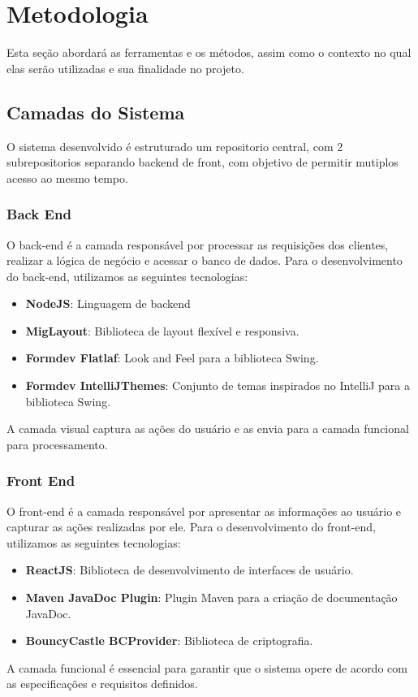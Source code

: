 \documentclass[../main.tex]{subfiles}
\begin{document}
\section{Metodologia}
Esta seção abordará as ferramentas e os métodos, assim como o contexto no qual elas 
serão utilizadas e sua finalidade no projeto.
\subsection{Camadas do Sistema}

O sistema desenvolvido é estruturado um repositorio central, com 2 subrepositorios separando backend de front, com objetivo de permitir mutiplos acesso ao mesmo tempo.

\subsubsection{Back End}
O back-end é a camada responsável por processar as requisições dos clientes, realizar a lógica de negócio e acessar o banco de dados. Para o desenvolvimento do back-end, utilizamos as seguintes tecnologias:
\begin{itemize}
    \item \textbf{NodeJS}: Linguagem de backend
    \item \textbf{MigLayout}: Biblioteca de layout flexível e responsiva. 
    \item \textbf{Formdev Flatlaf}: Look and Feel para a biblioteca Swing.
    \item \textbf{Formdev IntelliJThemes}: Conjunto de temas inspirados no IntelliJ para a biblioteca Swing.
\end{itemize}
A camada visual captura as ações do usuário e as envia para a camada funcional para processamento.

\subsubsection{Front End}
O front-end é a camada responsável por apresentar as informações ao usuário e capturar as ações realizadas por ele. Para o desenvolvimento do front-end, utilizamos as seguintes tecnologias:
\begin{itemize}
    \item \textbf{ReactJS}: Biblioteca de desenvolvimento de interfaces de usuário.
    \item \textbf{Maven JavaDoc Plugin}: Plugin Maven para a criação de documentação JavaDoc.
    \item \textbf{BouncyCastle BCProvider}: Biblioteca de criptografia.
\end{itemize}
A camada funcional é essencial para garantir que o sistema opere de acordo com as especificações e requisitos definidos.
\end{document}
